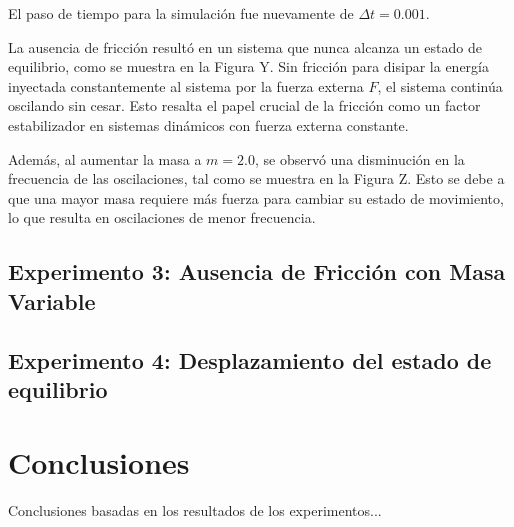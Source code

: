 \documentclass{article}
\begin{document}
El paso de tiempo para la simulación fue nuevamente de $\Delta t= 0.001$.

La ausencia de fricción resultó en un sistema que nunca alcanza un estado de equilibrio, como se muestra en la Figura Y. Sin fricción para disipar la energía inyectada constantemente al sistema por la fuerza externa $F$, el sistema continúa oscilando sin cesar. Esto resalta el papel crucial de la fricción como un factor estabilizador en sistemas dinámicos con fuerza externa constante.

Además, al aumentar la masa a $m = 2.0$, se observó una disminución en la frecuencia de las oscilaciones, tal como se muestra en la Figura Z. Esto se debe a que una mayor masa requiere más fuerza para cambiar su estado de movimiento, lo que resulta en oscilaciones de menor frecuencia.



\subsection{Experimento 3: Ausencia de Fricción con Masa Variable}



\subsection{Experimento 4: Desplazamiento del estado de equilibrio}

\section{Conclusiones}
Conclusiones basadas en los resultados de los experimentos...
\end{document}
